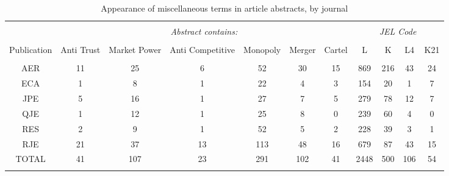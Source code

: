 \documentclass[11pt, letterpaper, twoside]{article}
\begin{document}
\begin{table}[h] \centering 
    \caption{Appearance of miscellaneous terms in article abstracts, by journal} 
    \label{} 
    \begin{adjustbox}{max width=\textwidth}
        \begin{tabular}{@{\extracolsep{5pt}} ccccccccccc} 
            \\[-1.8ex]\hline 
            \hline \\[-1.8ex]
            & \multicolumn{6}{c}{\textit{Abstract contains:}} & \multicolumn{4}{c}{\textit{JEL Code}} \\ 
          \cline{2-7} \cline{8-11} \\
            Publication & Anti Trust & Market Power & Anti Competitive & Monopoly & Merger & Cartel & L & K & L4 & K21 \\ 
            \hline \\[-1.8ex] 
            AER & 11 & 25 & 6 & 52 & 30 & 15 & 869 & 216 & 43 & 24 \\ 
            ECA & 1 & 8 & 1 & 22 & 4 & 3 & 154 & 20 & 1 & 7 \\ 
            JPE & 5 & 16 & 1 & 27 & 7 & 5 & 279 & 78 & 12 & 7 \\ 
            QJE & 1 & 12 & 1 & 25 & 8 & 0 & 239 & 60 & 4 & 0 \\ 
            RES & 2 & 9 & 1 & 52 & 5 & 2 & 228 & 39 & 3 & 1 \\ 
            RJE & 21 & 37 & 13 & 113 & 48 & 16 & 679 & 87 & 43 & 15 \\ 
            TOTAL & 41 & 107 & 23 & 291 & 102 & 41 & 2448 & 500 & 106 & 54 \\ 
            \hline \\[-1.8ex] 
        \end{tabular}    
    \end{adjustbox}
\end{table} 
\end{document}
